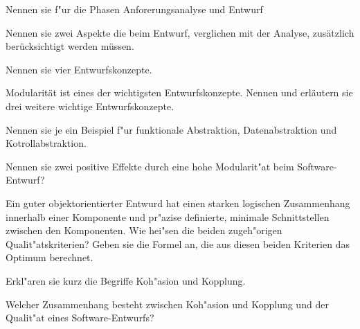 \documentclass[12pt]{exam}
\begin{document}
\begin{questions}
\question[5] Nennen sie f"ur die Phasen Anforerungsanalyse und Entwurf
\noaddpoints
{}
\addpoints

\question[2] Nennen sie zwei Aspekte die beim Entwurf, verglichen mit der Analyse, zusätzlich berücksichtigt werden müssen.
\addpoints

\question[4] Nennen sie vier Entwurfskonzepte.
\addpoints

\question[6] Modularität ist eines der wichtigsten Entwurfskonzepte. Nennen und erläutern sie drei weitere wichtige Entwurfskonzepte.
\addpoints

\question[3] Nennen sie je ein Beispiel f"ur funktionale Abstraktion, Datenabstraktion und Kotrollabstraktion.
\addpoints

\question[2] Nennen sie zwei positive Effekte durch eine hohe Modularit"at beim Software-Entwurf?
\addpoints

\question[4] Ein guter objektorientierter Entwurd hat einen starken logischen Zusammenhang innerhalb einer Komponente und pr"azise definierte, minimale Schnittstellen zwischen den Komponenten. Wie hei"sen die beiden zugeh"origen Qualit"atskriterien? Geben sie die Formel an, die aus diesen beiden Kriterien das Optimum berechnet.
\addpoints

\question[2] Erkl"aren sie kurz die Begriffe Koh"asion und Kopplung.
\addpoints

\question[4] Welcher Zusammenhang besteht zwischen Koh"asion und Kopplung und der Qualit"at eines Software-Entwurfs?
\addpoints


\end{questions}
\end{document}
